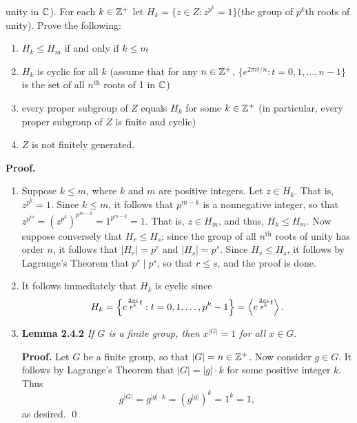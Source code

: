 \begin{enumerate}
                  unity in $\mathbb{C}$). For each $k \in \mathbb{Z}^+$ let
                  $H_k = \{z \in Z : z^{p^k} = 1\}$(the group of $p^k$th roots
                  of unity). Prove the following:
                  \begin{enumerate}
                     \item $H_k \le H_m$ if and only if $k \le m$
                     \item $H_k$ is cyclic for all $k$ (assume that for any
                           $n \in \mathbb{Z}^+$, $\{e^{2\pi it/n}:t =0,1,\ldots, n-1\}$
                           is the set of all $n^{\text{th}}$ roots of 1 in
                           $\mathbb{C}$)
                     \item every proper subgroup of $Z$ equals $H_k$ for some
                           $k \in \mathbb{Z}^+$ (in particular, every proper subgroup of
                           $Z$ is finite and cyclic)
                     \item $Z$ is not finitely generated.
                  \end{enumerate}

      \textbf{Proof.}

      \begin{enumerate}
         \item Suppose $k \le m$, where $k$ and $m$ are positive integers. Let
               $z \in H_k$. That is, $z^{p^k} = 1$. Since $k \le m$, it follows
               that $p^{m-k}$ is a nonnegative integer, so that
               $z^{p^m} = (z^{p^k})^{p^{m-k}} = 1^{p^{m-k}} = 1$. That is,
               $z \in H_m$, and thus, $H_k \le H_m$. Now suppose conversely that
               $H_r \le H_s$; since the group of all $n^{\text{th}}$ roots of 
               unity has order $n$, it follows that $|H_r| = p^r$ and
               $|H_s| = p^s$. Since $H_r \le H_s$, it follows by Lagrange's 
               Theorem that $p^r \mid p^s$, so that $r \le s$, and the proof is 
               done.
         \item It follows immediately that $H_k$ is cyclic since
               $$
                  H_k = \left\{e^{\frac{2\pi i}{p^k}t}: t = 0,1,\ldots,
                        p^k-1\right\} = \left\langle e^{\frac{2\pi i}{p^k}t} \right\rangle.
               $$
         \item \textbf{Lemma 2.4.2} \textit{If $G$ is a finite group, then
               $x^{|G|} = 1$ for all $x \in G$}.


               \textbf{Proof.} Let $G$ be a finite group, so that
               $|G| = n \in \mathbb{Z}^+$. Now consider $g \in G$. It follows by
               Lagrange's Theorem that $|G| = |g| \cdot k$ for some positive
               integer $k$. Thus
               $$g^{|G|} = g^{|g| \cdot k} = (g^{|g|})^k = 1^k = 1,$$
               as desired. \qed \\
         

\end{enumerate}
\end{enumerate}
